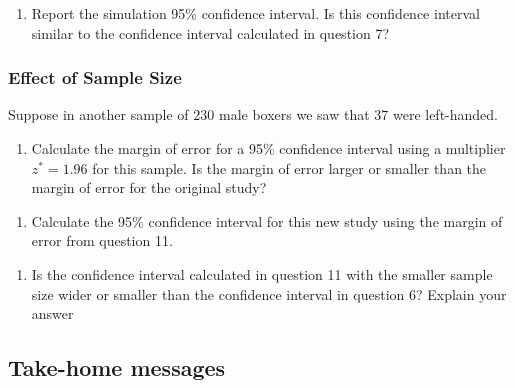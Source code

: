 \documentclass[
]{report}
\providecommand{\tightlist}{%
  \setlength{\itemsep}{0pt}\setlength{\parskip}{0pt}}
\begin{document}
\begin{enumerate}
\def\labelenumi{\arabic{enumi}.}
\setcounter{enumi}{9}
\tightlist
\item
  Report the simulation 95\% confidence interval. Is this confidence interval similar to the confidence interval calculated in question 7?
\end{enumerate}

\vspace{0.8in}

\hypertarget{effect-of-sample-size-1}{%
\subsubsection*{Effect of Sample Size}\label{effect-of-sample-size-1}}

Suppose in another sample of 230 male boxers we saw that 37 were left-handed.

\begin{enumerate}
\def\labelenumi{\arabic{enumi}.}
\setcounter{enumi}{10}
\tightlist
\item
  Calculate the margin of error for a 95\% confidence interval using a multiplier \(z^* = 1.96\) for this sample. Is the margin of error larger or smaller than the margin of error for the original study?
\end{enumerate}

\vspace{0.5in}

\begin{enumerate}
\def\labelenumi{\arabic{enumi}.}
\setcounter{enumi}{11}
\tightlist
\item
  Calculate the 95\% confidence interval for this new study using the margin of error from question 11.
\end{enumerate}

\vspace{0.5in}

\begin{enumerate}
\def\labelenumi{\arabic{enumi}.}
\setcounter{enumi}{12}
\tightlist
\item
  Is the confidence interval calculated in question 11 with the smaller sample size wider or smaller than the confidence interval in question 6? Explain your answer
  \vspace{1in}
\end{enumerate}

\hypertarget{take-home-messages-12}{%
\subsection{Take-home messages}\label{take-home-messages-12}}
\end{document}
